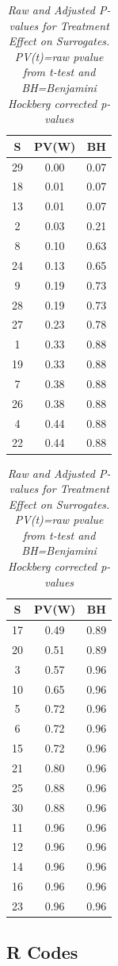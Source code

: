 \documentclass[a4paper,12pt]{article}
\begin{document}
\begin{table}[H]
		\quad
		\begin{tabular}{ccc}
			\hline
			S & PV(W) & BH \\ 
			\hline
			29 & 0.00 & 0.07 \\ 
			18 & 0.01 & 0.07 \\ 
			13 & 0.01 & 0.07 \\ 
			2 & 0.03 & 0.21 \\ 
			8 & 0.10 & 0.63 \\ 
			24 & 0.13 & 0.65 \\ 
			9 & 0.19 & 0.73 \\ 
			28 & 0.19 & 0.73 \\ 
			27 & 0.23 & 0.78 \\ 
			1 & 0.33 & 0.88 \\ 
			19 & 0.33 & 0.88 \\ 
			7 & 0.38 & 0.88 \\ 
			26 & 0.38 & 0.88 \\ 
			4 & 0.44 & 0.88 \\ 
			22 & 0.44 & 0.88 \\
			\hline
		\end{tabular}
		\quad
		\begin{tabular}{ccc}
			\hline
			S & PV(W) & BH \\ 
			\hline
			17 & 0.49 & 0.89 \\ 
			20 & 0.51 & 0.89 \\ 
			3 & 0.57 & 0.96 \\ 
			10 & 0.65 & 0.96 \\ 
			5 & 0.72 & 0.96 \\ 
			6 & 0.72 & 0.96 \\ 
			15 & 0.72 & 0.96 \\ 
			21 & 0.80 & 0.96 \\ 
			25 & 0.88 & 0.96 \\ 
			30 & 0.88 & 0.96 \\ 
			11 & 0.96 & 0.96 \\ 
			12 & 0.96 & 0.96 \\ 
			14 & 0.96 & 0.96 \\ 
			16 & 0.96 & 0.96 \\ 
			23 & 0.96 & 0.96 \\ 
			\hline
		\end{tabular}
		\caption{\emph{Raw and Adjusted P-values for Treatment Effect on Surrogates. PV(t)=raw pvalue from t-test and BH=Benjamini Hockberg corrected p-values}}\label{surrogate treatment effects}
	\end{table}
	
	\subsection*{R Codes}
\end{document}
